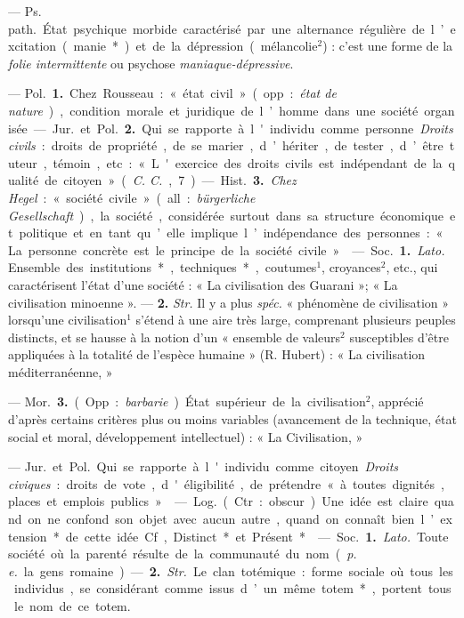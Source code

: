 \begin{itemize}[leftmargin=1cm, label=, itemsep=11pt]
 — \si{Ps. path.} État
psychique morbide caractérisé par
une alternance régulière de l’excitation (manie*) et de la dépression
(mélancolie$^2$) : c’est une forme de la
{\it folie intermittente} ou psychose {\it maniaque-dépressive}.

 — \si{Pol.} {\bf 1.} Chez Rousseau : « état
civil » (opp. : {\it état de nature}), condition morale et juridique de l’homme
dans une société organisée.

— \si{Jur.} et \si{Pol.} {\bf 2.} Qui se rapporte
à l'individu comme personne. {\it Droits
civils} : droits de propriété, de se
marier, d’hériter, de tester, d’être
tuteur, témoin, etc. : « L'exercice
des droits civils est indépendant de
la qualité de citoyen » ({\it C. C.}, 7).

— \si{Hist.} {\bf 3.} {\it Chez Hegel} : « société
civile » (all. : {\it bürgerliche Gesellschaft}),
la société, considérée surtout dans
sa structure économique et politique
et en tant qu’elle implique l’indépendance des personnes : « La personne concrète est le principe de la
société civile ».

 — \si{Soc.} {\bf 1.}  {\it Lato.} Ensemble
des institutions*, techniques*, coutumes$^1$, croyances$^2$, etc., qui caractérisent l’état d’une société : « La
civilisation des Guarani »; « La
civilisation minoenne ». — {\bf 2.}  {\it Str.}
Il y a plus  {\it spéc.} « phénomène de
civilisation » lorsqu'une civilisation$^1$
s’étend à une aire très large, comprenant plusieurs peuples distincts, et
se hausse à la notion d’un « ensemble
de valeurs$^2$ susceptibles d’être appliquées à la totalité de l'espèce
humaine » (R. Hubert) : « La civilisation méditerranéenne, »

— \si{Mor.} {\bf 3.} (Opp. : {\it barbarie}.) État
supérieur de la civilisation$^2$, apprécié d’après certains critères plus ou
moins variables (avancement de la
technique, état social et moral, développement intellectuel) : « La Civilisation, »

 — \si{Jur.} et \si{Pol.} Qui se rapporte à l'individu comme citoyen.
{\it Droits civiques} : droits de vote,
d'éligibilité, de prétendre « à toutes
dignités, places et emplois publics ».

 — \si{Log.} (Ctr. : obscur). Une idée
est claire quand on ne confond son
objet avec aucun autre, quand on
connaît bien l’extension* de cette
idée. Cf, Distinct* et Présent*.

 — \si{Soc.} {\bf 1.}  {\it Lato.} Toute société
où la parenté résulte de la communauté du nom ({\it p. e.} la gens romaine).
— {\bf 2.}  {\it Str.} Le clan totémique : forme
sociale où tous les individus, se
considérant comme issus d’un même
totem*, portent tous le nom de ce
totem.


\end{itemize}
